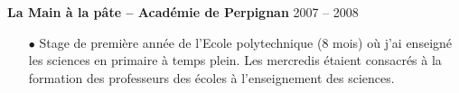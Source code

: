 \documentclass[11pt,a4paper, french]{article}
\begin{document}
\textbf{La Main à la pâte -- Académie de Perpignan} \hfill 2007 -- 2008
\begin{itemize} \itemsep 5pt
    \item[$\bullet$] Stage de première année de l'Ecole polytechnique (8 mois) où
     j'ai enseigné les sciences en primaire à temps plein. Les mercredis étaient
     consacrés à la formation des professeurs des écoles à l'enseignement des sciences.
\end{itemize}










\end{document}
